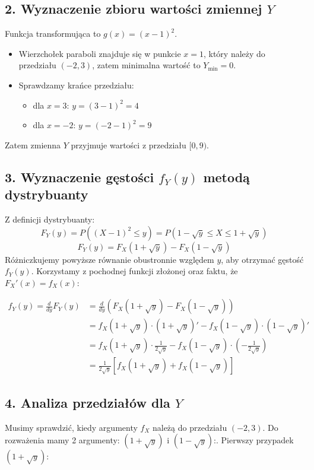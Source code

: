 \documentclass[polish, 10pt]{extarticle}
\theoremstyle{definition}
\begin{document}
\subsection*{2. Wyznaczenie zbioru wartości zmiennej \(Y\)}
Funkcja transformująca to \(g(x) = (x-1)^2\).
\begin{itemize}
    \item Wierzchołek paraboli znajduje się w punkcie \(x=1\), który należy do przedziału \((-2, 3)\), zatem minimalna wartość to \(Y_{\min} = 0\).
    \item Sprawdzamy krańce przedziału:
    \begin{itemize}
        \item dla \(x = 3\): \(y = (3-1)^2 = 4\)
        \item dla \(x = -2\): \(y = (-2-1)^2 = 9\)
    \end{itemize}
\end{itemize}
Zatem zmienna \(Y\) przyjmuje wartości z przedziału \([0, 9)\).

\subsection*{3. Wyznaczenie gęstości \(f_Y(y)\) metodą dystrybuanty}
Z definicji dystrybuanty:
\[ F_Y(y) = P((X-1)^2 \le y) = P(1-\sqrt{y} \le X \le 1+\sqrt{y}) \]
\[ F_Y(y) = F_X(1+\sqrt{y}) - F_X(1-\sqrt{y}) \]
Różniczkujemy powyższe równanie obustronnie względem \(y\), aby otrzymać gęstość \(f_Y(y)\). Korzystamy z pochodnej funkcji złożonej oraz faktu, że \(F_X'(x) = f_X(x)\):

\begin{align*}
    f_Y(y) = \frac{d}{dy} F_Y(y) &= \frac{d}{dy} \left( F_X(1+\sqrt{y}) - F_X(1-\sqrt{y}) \right) \\[1em]
    &= f_X(1+\sqrt{y}) \cdot (1+\sqrt{y})' - f_X(1-\sqrt{y}) \cdot (1-\sqrt{y})' \\[1em]
    &= f_X(1+\sqrt{y}) \cdot \frac{1}{2\sqrt{y}} - f_X(1-\sqrt{y}) \cdot \left( -\frac{1}{2\sqrt{y}} \right) \\[1em]
    &= \frac{1}{2\sqrt{y}} \left[ f_X(1+\sqrt{y}) + f_X(1-\sqrt{y}) \right]
\end{align*}

\subsection*{4. Analiza przedziałów dla \(Y\)}
Musimy sprawdzić, kiedy argumenty $f_X$ należą do przedziału \((-2, 3)\). Do rozważenia mamy 2 argumenty: $(1+\sqrt{y})$ i $(1-\sqrt{y})$:. Pierwszy przypadek $(1+\sqrt{y})$:
\end{document}
